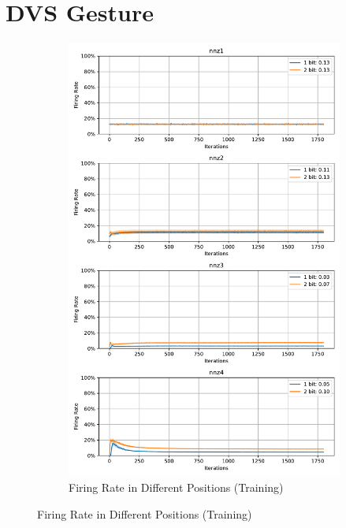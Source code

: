     \section{DVS Gesture}
    \label{appendix:firerate_dvs_gesture}
        \begin{figure}[H]
            \centering
            \begin{subfigure}[H]{\textwidth}
                \centering
                \includegraphics[width=\textwidth]{../firerate/DVSGesture/plots/dvsgesture_train_firerate.pdf}
                \caption{Firing Rate in Different Positions (Training)}
            \end{subfigure}
        \end{figure}
